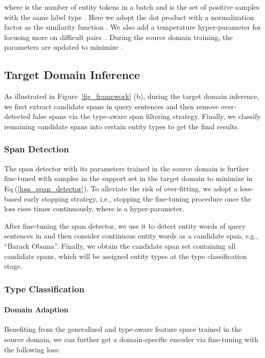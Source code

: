 \documentclass[11pt]{article}
\begin{document}
\vspace{-0mm}

\vspace{-0mm}

where  is the number of entity tokens in a batch and  is the set of positive samples with the same label type .
Here we adopt the dot product with a normalization factor as the similarity function .
We also add a temperature hyper-parameter  for focusing more on difficult pairs~\cite{pmlr-v119-chen20j}.
During the source domain training, the parameters  are updated to minimize .


\subsection{Target Domain Inference}
As illustrated in Figure~\ref{fig_framework} (b), during the target domain inference, we first extract candidate spans in query sentences and then remove over-detected false spans via the type-aware span filtering strategy. 
Finally, we classify remaining candidate spans into certain entity types to get the final results.


\subsubsection{Span Detection}\label{early_stopping_span}
The span detector with its parameters  trained in the source domain is further fine-tuned with samples in the support set  in the target domain  to minimize  in Eq.(\ref{loss_span_detector}).
To alleviate the risk of over-fitting, we adopt a loss-based early stopping strategy, i.e., stopping the fine-tuning procedure once the loss rises  times continuously, where  is a hyper-parameter.

After fine-tuning the span detector, we use it to detect entity words of query sentences in  and then consider continuous entity words as a candidate span, e.g., ``Barack Obama''.
Finally, we obtain the candidate span set  containing all candidate spans, which will be assigned  entity types at the type classification stage.




\subsubsection{Type Classification}


\paragraph{Domain Adaption}
Benefiting from the generalized and type-aware feature space trained in the source domain, we can further get a domain-specific encoder  via fine-tuning with the following loss:
\end{document}
